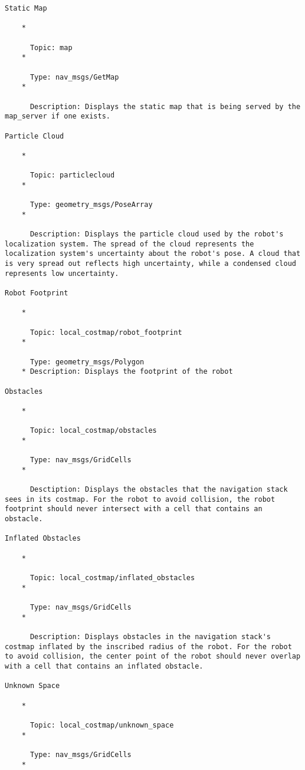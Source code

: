 \begin{verbatim}
Static Map

    *

      Topic: map
    *

      Type: nav_msgs/GetMap
    *

      Description: Displays the static map that is being served by the map_server if one exists. 

Particle Cloud

    *

      Topic: particlecloud
    *

      Type: geometry_msgs/PoseArray
    *

      Description: Displays the particle cloud used by the robot's localization system. The spread of the cloud represents the localization system's uncertainty about the robot's pose. A cloud that is very spread out reflects high uncertainty, while a condensed cloud represents low uncertainty. 

Robot Footprint

    *

      Topic: local_costmap/robot_footprint
    *

      Type: geometry_msgs/Polygon
    * Description: Displays the footprint of the robot 

Obstacles

    *

      Topic: local_costmap/obstacles
    *

      Type: nav_msgs/GridCells
    *

      Desctiption: Displays the obstacles that the navigation stack sees in its costmap. For the robot to avoid collision, the robot footprint should never intersect with a cell that contains an obstacle. 

Inflated Obstacles

    *

      Topic: local_costmap/inflated_obstacles
    *

      Type: nav_msgs/GridCells
    *

      Description: Displays obstacles in the navigation stack's costmap inflated by the inscribed radius of the robot. For the robot to avoid collision, the center point of the robot should never overlap with a cell that contains an inflated obstacle. 

Unknown Space

    *

      Topic: local_costmap/unknown_space
    *

      Type: nav_msgs/GridCells
    *


\end{verbatim}
